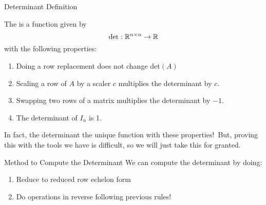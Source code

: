 \documentclass[xcoler=dvipsnames, aspectratio=169]{beamer}
\date{Determinants}
\begin{document}
    \begin{frame}{Determinant Definition}
        \small
        \begin{defn}
            The  is a function given by
            \[
                \textnormal{det}:\mathbb{R}^{n\times n}\rightarrow\mathbb{R}
            \]
            with the following properties:
            \begin{enumerate}
                \pause\item Doing a row replacement does not change det$(A)$
                \pause\item Scaling a row of $A$ by a scaler $c$ multiplies the determinant by $c$.
                \pause\item Swapping two rows of a matrix multiplies the determinant by $-1$.
                \pause\item The determinant of $I_n$ is 1.
            \end{enumerate}
        \end{defn}
        \pause
        \begin{tcolorbox}
            In fact, the determinant the unique function with these properties!\pause\ 
            But, proving this with the tools we have is difficult, so we will just take this for granted.
        \end{tcolorbox}
    \end{frame}
    \begin{frame}{Method to Compute the Determinant}
        We can compute the determinant by doing:
        \begin{enumerate}
            \pause\item Reduce to reduced row echelon form
            \pause\item Do operations in reverse following previous rules!
        \end{enumerate}
    \end{frame}
\end{document}
